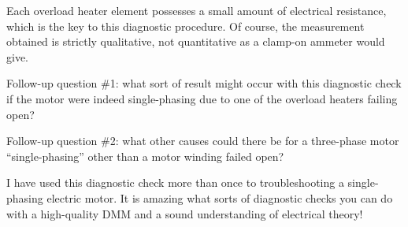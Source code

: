 





Each overload heater element possesses a small amount of electrical resistance, which is the key to this diagnostic procedure.  Of course, the measurement obtained is strictly qualitative, not quantitative as a clamp-on ammeter would give.

\vskip 10pt

Follow-up question \#1: what sort of result might occur with this diagnostic check if the motor were indeed single-phasing due to one of the overload heaters failing open?

\vskip 10pt

Follow-up question \#2: what other causes could there be for a three-phase motor ``single-phasing'' other than a motor winding failed open?







I have used this diagnostic check more than once to troubleshooting a single-phasing electric motor.  It is amazing what sorts of diagnostic checks you can do with a high-quality DMM and a sound understanding of electrical theory!




